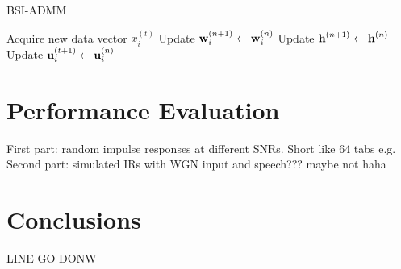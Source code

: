 \documentclass{article}
\newcommand{\h}{\mtxb{h}}
\newcommand{\w}{\mtxb{w}}
\newcommand{\uu}{\mtxb{u}}
\begin{document}
\begin{algorithm}
    \caption{BSI-ADMM}\label{alg:dbsi}
    \begin{algorithmic}
                \State Acquire new data vector \(x_i^{(t)}\)
                \State Update \(\w_i^{(n+1)} \leftarrow \w_i^{(n)}\)
            \EndFor
            \State Update \(\h^{(n+1)} \leftarrow \h^{(n)}\)
                \State Update \(\uu_i^{(t+1)} \leftarrow \uu_i^{(n)}\)
            \EndFor
        \EndFor
    \end{algorithmic}
\end{algorithm}

\section{Performance Evaluation}
\label{sec:perf_eval}

First part: random impulse responses at different SNRs. Short like 64 tabs e.g.
Second part: simulated IRs with WGN input and speech??? maybe not haha

\section{Conclusions}
\label{sec:conclusion}
LINE GO DONW

	

% 
% 
\end{document}
